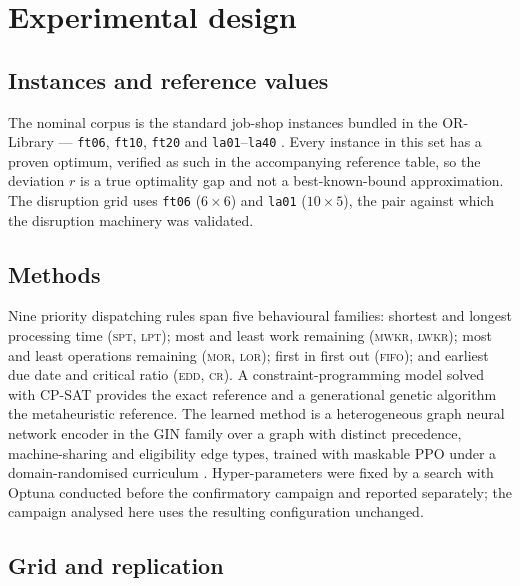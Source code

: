 \documentclass[a4paper,fleqn]{cas-sc}
\begin{document}
\section{Experimental design}\label{sec:design}

\subsection{Instances and reference values}

The nominal corpus is the \NInstances{} standard job-shop instances bundled in
the OR-Library --- \texttt{ft06}, \texttt{ft10}, \texttt{ft20}
\citep{fisher1963} and \texttt{la01}--\texttt{la40} \citep{lawrence1984}. Every
instance in this set has a proven optimum, verified as such in the accompanying
reference table, so the deviation $r$ is a true optimality gap and not a
best-known-bound approximation. The disruption grid uses \texttt{ft06}
($6\times6$) and \texttt{la01} ($10\times5$), the pair against which the
disruption machinery was validated.

\subsection{Methods}

Nine priority dispatching rules span five behavioural families: shortest and
longest processing time (\textsc{spt}, \textsc{lpt}); most and least work
remaining (\textsc{mwkr}, \textsc{lwkr}); most and least operations remaining
(\textsc{mor}, \textsc{lor}); first in first out (\textsc{fifo}); and earliest
due date and critical ratio (\textsc{edd}, \textsc{cr}). A constraint-programming
model solved with CP-SAT \citep{ortools} provides the exact reference and a
generational genetic algorithm the metaheuristic reference. The learned method
is a heterogeneous graph neural network encoder in the GIN family
\citep{xu2019} over a graph with distinct precedence, machine-sharing and
eligibility edge types, trained with maskable PPO \citep{schulman2017,raffin2021}
under a domain-randomised curriculum \citep{tobin2017}. Hyper-parameters were
fixed by a search with Optuna \citep{akiba2019} conducted before the
confirmatory campaign and reported separately; the campaign analysed here uses
the resulting configuration unchanged.

\subsection{Grid and replication}
\end{document}
